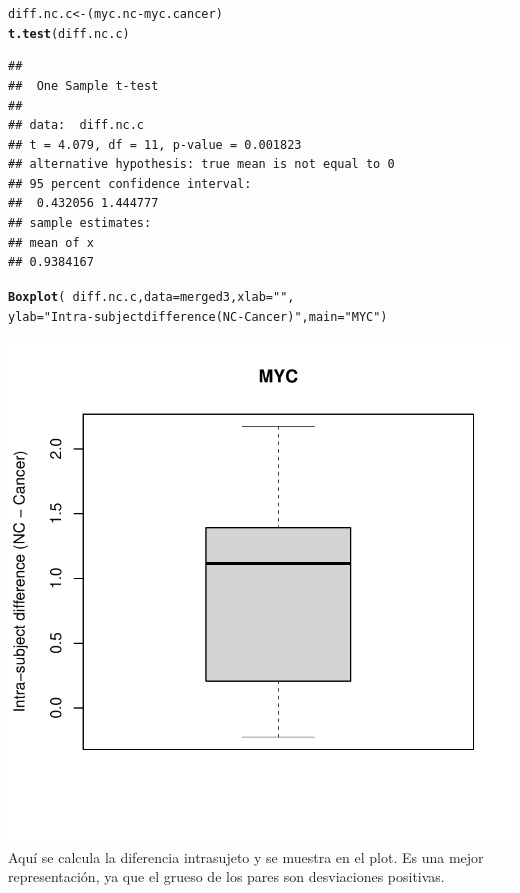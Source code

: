 \documentclass{config/apuntes}\usepackage[]{graphicx}\usepackage[]{xcolor}
\makeatletter
\def\maxwidth{ %
  \ifdim\Gin@nat@width>\linewidth
    \linewidth
  \else
    \Gin@nat@width
  \fi
}
\newcommand{\hlsng}[1]{\textcolor[rgb]{0.192,0.494,0.8}{#1}}%
\newcommand{\hlopt}[1]{\textcolor[rgb]{0,0,0}{#1}}%
\newcommand{\hldef}[1]{\textcolor[rgb]{0.345,0.345,0.345}{#1}}%
\newcommand{\hlkwb}[1]{\textcolor[rgb]{0.69,0.353,0.396}{#1}}%
\newcommand{\hlkwc}[1]{\textcolor[rgb]{0.333,0.667,0.333}{#1}}%
\newcommand{\hlkwd}[1]{\textcolor[rgb]{0.737,0.353,0.396}{\textbf{#1}}}%
\newenvironment{kframe}{%
 \def\at@end@of@kframe{}%
 \ifinner\ifhmode%
  \def\at@end@of@kframe{\end{minipage}}%
  \begin{minipage}{\columnwidth}%
 \fi\fi%
 \def\FrameCommand##1{\hskip\@totalleftmargin \hskip-\fboxsep
 \colorbox{shadecolor}{##1}\hskip-\fboxsep
     \hskip-\linewidth \hskip-\@totalleftmargin \hskip\columnwidth}%
 \MakeFramed {\advance\hsize-\width
   \@totalleftmargin\z@ \linewidth\hsize
   \@setminipage}}%
 {\par\unskip\endMakeFramed%
 \at@end@of@kframe}
\newenvironment{knitrout}{}{} %
\makeatother
\begin{document}
\begin{knitrout}
\color{fgcolor}\begin{kframe}
\begin{alltt}
\hldef{diff.nc.c} \hlkwb{<-} \hldef{(myc.nc} \hlopt{-} \hldef{myc.cancer)}
\hlkwd{t.test}\hldef{(diff.nc.c)}
\end{alltt}
\begin{verbatim}
## 
## 	One Sample t-test
## 
## data:  diff.nc.c
## t = 4.079, df = 11, p-value = 0.001823
## alternative hypothesis: true mean is not equal to 0
## 95 percent confidence interval:
##  0.432056 1.444777
## sample estimates:
## mean of x 
## 0.9384167
\end{verbatim}
\begin{alltt}
\hlkwd{Boxplot}\hldef{(} \hlopt{~} \hldef{diff.nc.c,} \hlkwc{data} \hldef{= merged3,} \hlkwc{xlab} \hldef{=} \hlsng{""}\hldef{,}
         \hlkwc{ylab} \hldef{=} \hlsng{"Intra-subject difference (NC - Cancer)"}\hldef{,} \hlkwc{main} \hldef{=} \hlsng{"MYC"}\hldef{)}
\end{alltt}
\end{kframe}
\includegraphics[width=\maxwidth]{figure/unnamed-chunk-139-1} 
\end{knitrout}
Aquí se calcula la diferencia intrasujeto y se muestra en el plot. Es una mejor representación, ya que el grueso de los pares son desviaciones positivas. 
\end{document}
